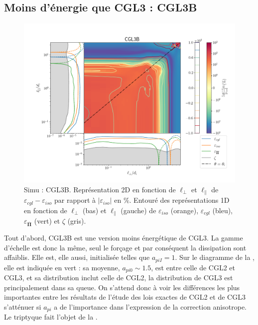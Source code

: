 \subsection{Moins d'énergie que CGL3 : CGL3B}
\begin{figure}[!ht]
 \centering
 \includegraphics[width=0.95\linewidth,trim=1cm 1cm 0cm 2cm, clip=true]{./Part_3/images_ch3/CGL3B_panel_isocgl_percent}
\cprotect\caption{Simu : CGL3B. Représentation 2D en fonction de $\ell_{\perp}$ et $\ell_{\parallel}$ de $\varepsilon_{cgl}-\varepsilon_{iso}$ par rapport à $|\varepsilon_{iso}|$ en $\%$. Entouré des représentations 1D en fonction de $\ell_{\perp}$ (bas) et $\ell_{\parallel}$ (gauche) de $\varepsilon_{iso}$ (orange), $\varepsilon_{cgl}$ (bleu), $\varepsilon_{\overline{\boldsymbol{\Pi}}} $ (vert) et $\zeta$ (gris). }
\label{fig:trip_CGL3B}
\end{figure}
Tout d'abord, CGL3B est une version moins énergétique de CGL3. La gamme d'échelle est donc la même, seul le forçage et par conséquent la dissipation sont affaiblis. Elle est, elle aussi, initialisée telles que $a_{piI} = 1$. Sur le diagramme de la , elle est indiquée en vert : sa moyenne, $a_{pi0} \sim 1.5$,  est entre celle de CGL2 et CGL3, et sa distribution inclut celle de CGL2, la distribution de CGL3 est principalement dans sa queue. On s'attend donc à voir les différences les plus importantes entre les résultats de l'étude des lois exactes de CGL2 et de CGL3 s'atténuer si $a_{pi}$ a de l'importance dans l'expression de la correction anisotrope.  Le triptyque fait l'objet de la . %

